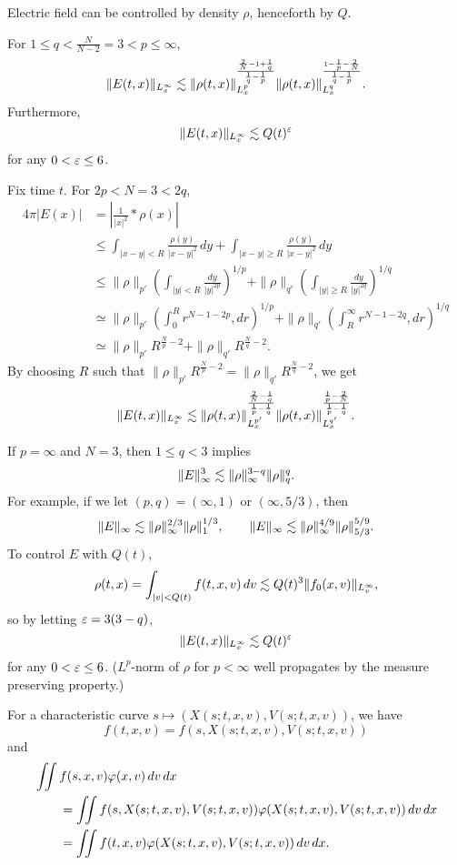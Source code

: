 \documentclass[11pt]{article}
\begin{document}
Electric field can be controlled by density $\rho$, henceforth by $Q$.
\begin{lem}
For $1\le q<\frac N{N-2}=3<p\le\infty$,
\[\|E(t,x)\|_{L_x^\infty}\lesssim\|\rho(t,x)\|_{L_x^p}^{\frac{\frac2N-1+\frac1q}{\frac1q-\frac1p}}\|\rho(t,x)\|_{L_x^q}^{\frac{1-\frac1p-\frac2N}{\frac1q-\frac1p}}.\]
Furthermore,
\[\|E(t,x)\|_{L_x^\infty}\lesssim Q(t)^\varepsilon\]
for any $0<\varepsilon\le6$.
\end{lem}
\begin{pf}
Fix time $t$.
For $2p<N=3<2q$,
\begin{align*}
4\pi|E(x)|
&=|\tfrac1{|x|^2}*\rho(x)|\\
&\le\int_{|x-y|<R}\frac{\rho(y)}{|x-y|^2}\,dy+\int_{|x-y|\ge R}\frac{\rho(y)}{|x-y|^2}\,dy\\
&\le\|\rho\|_{p'}(\int_{|y|<R}\frac{dy}{|y|^{2p}})^{1/p}+\|\rho\|_{q'}(\int_{|y|\ge R}\frac{dy}{|y|^{2q}})^{1/q}\\
&\simeq\|\rho\|_{p'}(\int_0^Rr^{N-1-2p},dr)^{1/p}+\|\rho\|_{q'}(\int_R^\infty r^{N-1-2q},dr)^{1/q}\\
&\simeq\|\rho\|_{p'}R^{\frac Np-2}+\|\rho\|_{q'}R^{\frac Nq-2}.
\end{align*}
By choosing $R$ such that $\|\rho\|_{p'}R^{\frac Np-2}=\|\rho\|_{q'}R^{\frac Nq-2}$, we get
\[\|E(t,x)\|_{L_x^\infty}\lesssim\|\rho(t,x)\|_{L_x^{p'}}^{\frac{\frac2N-\frac1q}{\frac1p-\frac1q}}\|\rho(t,x)\|_{L_x^{q'}}^{\frac{\frac1p-\frac2N}{\frac1p-\frac1q}}.\]

If $p=\infty$ and $N=3$, then $1\le q<3$ implies
\[\|E\|_\infty^3\lesssim\|\rho\|_\infty^{3-q}\|\rho\|_q^q.\]
For example, if we let $(p,q)=(\infty,1)$ or $(\infty,5/3)$, then
\[\|E\|_\infty\lesssim\|\rho\|_\infty^{2/3}\|\rho\|_1^{1/3},\qquad
\|E\|_\infty\lesssim\|\rho\|_\infty^{4/9}\|\rho\|_{5/3}^{5/9}.\]
To control $E$ with $Q(t)$,
\[\rho(t,x)=\int_{|v|<Q(t)}f(t,x,v)\,dv\lesssim Q(t)^3\|f_0(x,v)\|_{L_v^\infty},\]
so by letting $\varepsilon=3(3-q)$,
\[\|E(t,x)\|_{L_x^\infty}\lesssim Q(t)^\varepsilon\]
for any $0<\varepsilon\le6$.
($L^p$-norm of $\rho$ for $p<\infty$ well propagates by the measure preserving property.)
\end{pf}


For a characteristic curve $s\mapsto(X(s;t,x,v),V(s;t,x,v))$, we have
\[f(t,x,v)=f(s,X(s;t,x,v),V(s;t,x,v))\]
and
\begin{align*}
&\iint f(s,x,v)\varphi(x,v)\,dv\,dx\\
&\qquad=\iint f(s,X(s;t,x,v),V(s;t,x,v))\varphi(X(s;t,x,v),V(s;t,x,v))\,dv\,dx\\
&\qquad=\iint f(t,x,v)\varphi(X(s;t,x,v),V(s;t,x,v))\,dv\,dx.
\end{align*}
\end{document}
